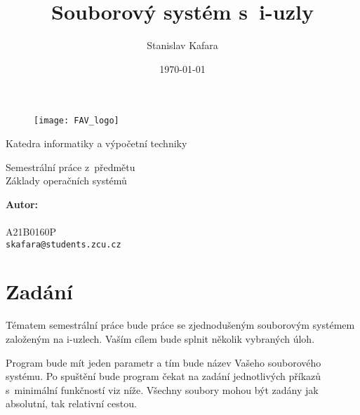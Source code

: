 \documentclass[a4paper, 12pt]{report}
\title{Souborový systém s~i-uzly}
\author{Stanislav Kafara}
\date{\today}
\begin{document}
\begin{titlepage}

\begin{center}

\begin{figure}
\centering
\texttt{[image: FAV\_logo]}
\end{figure}

Katedra informatiky a výpočetní techniky

\vspace{5\baselineskip}

Semestrální práce z~předmětu\\
Základy operačních systémů

\vspace{2\baselineskip}

{\makeatletter
\LARGE \bfseries \@title
\makeatother}

\end{center}

\vfill

\begin{flushleft}

\textbf{Autor:}\\
{\makeatletter
\@author
\makeatother}\\
A21B0160P\\
\texttt{skafara@students.zcu.cz}

\end{flushleft}

\end{titlepage}

\begin{tableofcontents}

\end{tableofcontents}

\chapter{Zadání}

Tématem semestrální práce bude práce se zjednodušeným souborovým systémem založeným na
i-uzlech. Vaším cílem bude splnit několik vybraných úloh.

Program bude mít jeden parametr a tím bude název Vašeho souborového systému. Po spuštění bude
program čekat na zadání jednotlivých příkazů s~minimální funkčností viz níže. Všechny soubory
mohou být zadány jak absolutní, tak relativní cestou.
\end{document}
